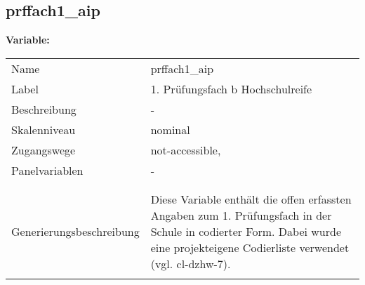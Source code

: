 	
	
	\subsection{prffach1\_aip}
	\label{subSection:prffach1_aip}

	\noindent\textbf{Variable:}\\
		\begin{tabular}{lL{11.3cm}}
			\label{tableVariable:prffach1_aip}
			Name & prffach1\_aip \\
			Label & 1. Prüfungsfach b Hochschulreife \\
			Beschreibung & - \\
			Skalenniveau & nominal \\
			Zugangswege &
				not-accessible,
 \\
			Panelvariablen & -
			 \\
			 \\
 \\
					Generierungsbeschreibung & Diese Variable enthält die offen erfassten Angaben zum 1. Prüfungsfach in der Schule in codierter Form. Dabei wurde eine projekteigene Codierliste verwendet (vgl. cl-dzhw-7).
				 \\	
			 \\
		\end{tabular}






	
	\newpage
